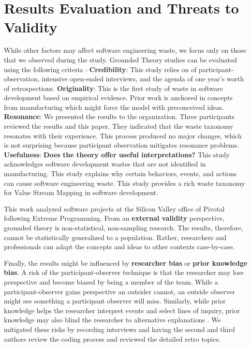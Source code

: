\section{Results Evaluation and Threats to Validity}
\label{ResultsEvaluation}
While other factors may affect software engineering waste, we focus only on those that we observed during the study. Grounded Theory studies can be evaluated using the following criteria \cite{Charmaz, StolGroundedTheory}:
\textbf{Credibility}:   This study relies on \durationOfResearchStudyPlural{} of participant-observation, \numberOfInterviews{} intensive open-ended interviews, and the agenda of one year's worth of retrospections. 
\textbf{Originality}:   This is the first study of waste in software development based on empirical evidence. Prior work is anchored in concepts from manufacturing which might force the model with preconceived ideas. 
\textbf{Resonance}:  We presented the results to the organization. Three participants reviewed the results and this paper. They indicated that the waste taxonomy resonates with their experience.    This process produced no major changes, which is not surprising because participant observation mitigates resonance problems.
\textbf{Usefulness}: \textbf{Does the theory offer useful interpretations?} This study acknowledges software development wastes that are not identified in manufacturing. This study explains why certain behaviors, events, and actions can cause software engineering waste. This study provides a rich waste taxonomy for Value Stream Mapping in software development. 

This work analyzed software projects at the Silicon Valley office of Pivotal following Extreme Programming. From an \textbf{external validity} perspective, grounded theory is non-statistical, non-sampling research. The results, therefore, cannot be statistically generalized to a population. Rather, researchers and professionals can adapt the concepts and ideas to other contexts case-by-case.

Finally, the results might be influenced by \textbf{researcher bias} or \textbf{prior knowledge bias}. A risk of the participant-observer technique is that the researcher may lose perspective and become biased by being a member of the team. While a participant-observer gains perspective an outsider cannot, an outside observer might see something a participant observer will miss. Similarly, while prior knowledge helps the researcher interpret events and select lines of inquiry, prior knowledge may also blind the researcher to alternative explanations \cite{GlaserIssues}. We mitigated these risks by recording interviews and having the second and third authors review the coding process and reviewed the detailed retro topics.


